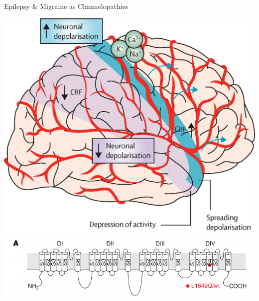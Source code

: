 \documentclass[10pt]{beamer}
\begin{document}
\begin{frame}[allowframebreaks]{Epilepsy \& Migraine as Channelopathies}
\begin{center}
 \end{center}
 \framebreak
     \begin{center}
  \includegraphics[keepaspectratio,width=0.38\framewidth]{img/0_channelo_migraine.jpg}
  \includegraphics[keepaspectratio,width=0.58\framewidth]{img/0_channelo_nav11_mig.png}
 \end{center}
\end{frame}
\end{document}
